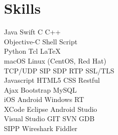 \documentclass[a4paper]{lyu-resume} %
\begin{document}
\begin{minipage}[t]{0.33\textwidth} %


\section{Skills}

Java \textbullet{} Swift \textbullet{} C \textbullet{} C++\\
Objective-C \textbullet{} Shell Script \\
Python \textbullet{} Tcl \textbullet{} \LaTeX\\
macOS \textbullet{} Linux (CentOS, Red Hat)\\
TCP/UDP \textbullet{} SIP \textbullet{} SDP \textbullet{} RTP \textbullet{} SSL/TLS\\
Javascript \textbullet{} HTML5 \textbullet{} CSS \textbullet{} Restful \\
Ajax \textbullet{} Bootstrap \textbullet{} MySQL \\ 
iOS \textbullet{} Android \textbullet{} Windows RT \\
XCode \textbullet{} Eclipse \textbullet{} Android Studio\\
Visual Studio \textbullet{} GIT \textbullet{} SVN \textbullet{} GDB\\
SIPP \textbullet{} Wireshark \textbullet{} Fiddler
\sectionspace %







\end{minipage}
\end{document}
